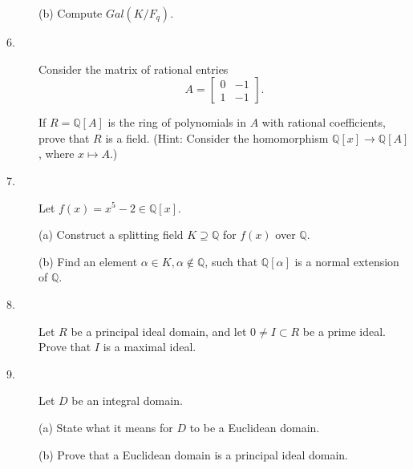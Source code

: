\documentclass{article}
\def\Q{\mathbb Q}
\begin{document}
\begin{description}
\item[\quad] (b)
Compute $Gal(K/F_q)$.

\item[6.]
Consider the matrix of rational entries
$$A= \begin{bmatrix} 0&-1 \\ 1&-1 \end{bmatrix}.$$

If $R=\Q[A]$ is the ring of polynomials in $A$ with rational coefficients,
prove that $R$ is a field. (Hint: Consider the homomorphism $\Q[x] \to \Q[A]$,
where $x \mapsto A$.)

\item[7.]
Let $f(x) = x^5 - 2 \in \Q[x]$.

\item[\quad] (a)
Construct a splitting field $K \supseteq \Q$ for $f(x)$ over $\Q$.

\item[\quad] (b)
Find an element $\alpha \in K, \alpha \notin \Q$, such that
$\Q[\alpha]$ is a normal extension of $\Q$.

\item[8.]
Let $R$ be a principal ideal domain, and let $0 \neq I \subset R$ be a prime
ideal. Prove that $I$ is a maximal ideal.

\item[9.]
Let $D$ be an integral domain.

\item[\quad] (a)
State what it means for $D$ to be a Euclidean domain.

\item[\quad] (b)
Prove that a Euclidean domain is a principal ideal domain.






\end{description}    
\end{document}
